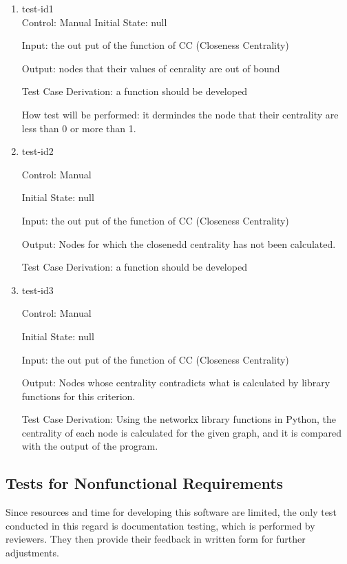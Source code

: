 \documentclass[12pt, titlepage]{article}
\begin{document}
\begin{enumerate}

\item{test-id1\\}	
Control: Manual				
Initial State: null
					
Input: the out put of the function of CC (Closeness Centrality)
					
Output: nodes that their values of cenrality are out of bound

Test Case Derivation: a function should be developed 

How test will be performed: it dermindes the node that their centrality are less than 0 or more than 1.
\item{test-id2\\}

Control: Manual
					
Initial State: null
					
Input: the out put of the function of CC (Closeness Centrality)
					
Output: Nodes for which the closenedd centrality has not been calculated.

Test Case Derivation: a function should be developed 

\item{test-id3\\}

Control: Manual
					
Initial State: null
					
Input: the out put of the function of CC (Closeness Centrality)
					
Output: Nodes whose centrality contradicts what is calculated by library functions for this criterion.

Test Case Derivation: Using the networkx library functions in Python, the centrality of each node is calculated for the given graph, and it is compared with the output of the program.


\end{enumerate}

\subsection{Tests for Nonfunctional Requirements}
Since resources and time for developing this software are limited, the only test conducted in this regard is documentation testing, which is performed by reviewers. They then provide their feedback in written form for further adjustments.
\end{document}

